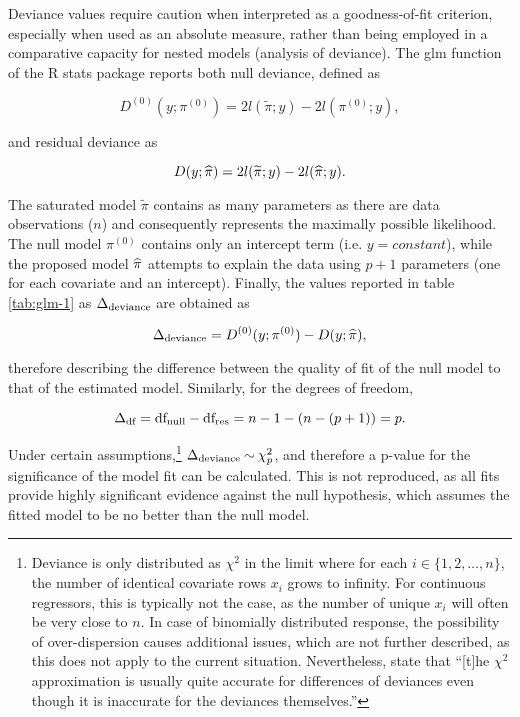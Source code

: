 Deviance values require caution when interpreted as a goodness-of-fit criterion, especially when used as an absolute measure, rather than being employed in a comparative capacity for nested models (analysis of deviance). The glm function of the R stats package reports both null deviance, defined as

\begin{equation}
  D^{(0)}(y; \pi^{(0)}) = 2l(\widetilde{\pi}; y) - 2l(\pi^{(0)}; y),
\end{equation}

and residual deviance as

\begin{equation}
  D(y; \widehat{\pi}) = 2l(\widetilde{\pi}; y) - 2l(\widehat{\pi}; y).
\end{equation}

The saturated model $\widetilde{\pi}$ contains as many parameters as there are data observations ($n$) and consequently represents the maximally possible likelihood. The null model $\pi^{(0)}$ contains only an intercept term (i.e. $y = constant$), while the proposed model $\widehat{\pi}$ attempts to explain the data using $p+1$ parameters (one for each covariate and an intercept). Finally, the values reported in table \ref{tab:glm-1} as $\Delta\textsubscript{deviance}$ are obtained as

\begin{equation}
  \Delta\textsubscript{deviance} = D^{(0)}(y; \pi^{(0)}) - D(y; \widehat{\pi}),
\end{equation}

therefore describing the difference between the quality of fit of the null model to that of the estimated model. Similarly, for the degrees of freedom, 

\begin{equation}
  \Delta\textsubscript{df} = \text{df}_\text{null} - \text{df}_\text{res} = n-1 -(n-(p+1)) = p.
\end{equation}

Under certain assumptions,\footnote{Deviance is only distributed as $\chi^2$ in the limit where for each $i \in \{1, 2, \dotsc, n\}$, the number of identical covariate rows $x_i$ grows to infinity. For continuous regressors, this is typically not the case, as the number of unique $x_i$ will often be very close to $n$. In case of binomially distributed response, the possibility of over-dispersion causes additional issues, which are not further described, as this does not apply to the current situation. Nevertheless, \citeauthor{Nelder1972} state that ``[t]he $\chi^2$ approximation is usually quite accurate for differences of deviances even though it is inaccurate for the deviances themselves.''} $\Delta\textsubscript{deviance} \mathbin{\sim} \chi^2_p$, and therefore a p-value for the significance of the model fit can be calculated. This is not reproduced, as all fits provide highly significant evidence against the null hypothesis, which assumes the fitted model to be no better than the null model.

